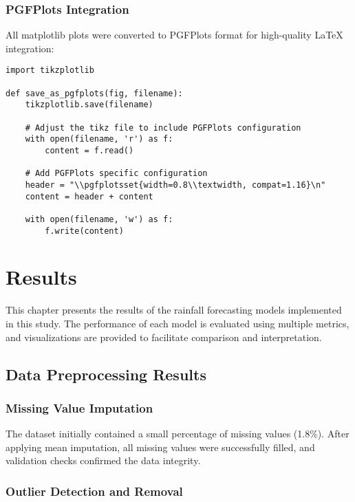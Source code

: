 \documentclass[12pt]{article}
\begin{document}
\subsection{PGFPlots Integration}
\label{subsec:pgfplots}

All matplotlib plots were converted to PGFPlots format for high-quality LaTeX integration:

\begin{verbatim}
import tikzplotlib

def save_as_pgfplots(fig, filename):
    tikzplotlib.save(filename)
    
    # Adjust the tikz file to include PGFPlots configuration
    with open(filename, 'r') as f:
        content = f.read()
    
    # Add PGFPlots specific configuration
    header = "\\pgfplotsset{width=0.8\\textwidth, compat=1.16}\n"
    content = header + content
    
    with open(filename, 'w') as f:
        f.write(content)
\end{verbatim}

\chapter{Results}
\label{chap:results}

This chapter presents the results of the rainfall forecasting models implemented in this study. The performance of each model is evaluated using multiple metrics, and visualizations are provided to facilitate comparison and interpretation.

\section{Data Preprocessing Results}
\label{sec:preprocessing_results}

\subsection{Missing Value Imputation}
\label{subsec:missing_value_results}

The dataset initially contained a small percentage of missing values (1.8\%). After applying mean imputation, all missing values were successfully filled, and validation checks confirmed the data integrity.

\subsection{Outlier Detection and Removal}
\label{subsec:outlier_results}
\end{document}
